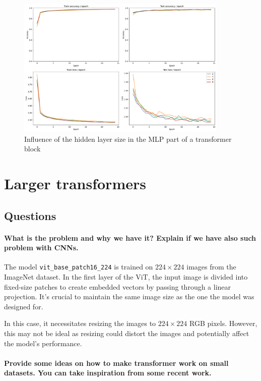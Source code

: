 \begin{figure}[H]
    \centering
    \includegraphics*[width=0.9\textwidth]{figs/Transformers/mlp_ratio_influence_25.pdf}
    \caption{Influence of the hidden layer size in the MLP part of a transformer block}
    \label{fig:mlp_ratio_influence}
\end{figure}

\section{Larger transformers}
\subsection{Questions}
\paragraph{What is the problem and why we have it? Explain if we have also such problem with CNNs.}
The model \texttt{vit\_base\_patch16\_224} is trained on $224 \times 224$ images from the ImageNet dataset. In the first layer of the ViT, the input image is divided into fixed-size patches to create embedded vectors by passing through a linear projection. It's crucial to maintain the same image size as the one the model was designed for.

In this case, it necessitates resizing the images to $224 \times 224$ RGB pixels. However, this may not be ideal as resizing could distort the images and potentially affect the model's performance.

\paragraph{Provide some ideas on how to make transformer work on small datasets. You can take inspiration from some recent work.}

